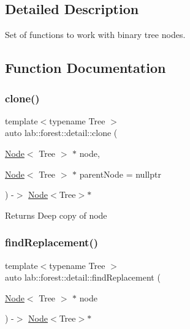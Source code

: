 \subsection{Detailed Description}
Set of functions to work with binary tree nodes. 

\subsection{Function Documentation}
\mbox{\label{namespacelab_1_1forest_1_1detail_a1268b660bcac79b1fb63758a157cba64}} 
\subsubsection{\texorpdfstring{clone()}{clone()}}
{\footnotesize\ttfamily template$<$typename Tree $>$ \\
auto lab\+::forest\+::detail\+::clone (\begin{DoxyParamCaption}\item[{\hyperlink{structlab_1_1forest_1_1detail_1_1Node}{Node}$<$ Tree $>$ $\ast$}]{node,  }\item[{\hyperlink{structlab_1_1forest_1_1detail_1_1Node}{Node}$<$ Tree $>$ $\ast$}]{parent\+Node = {\ttfamily nullptr} }\end{DoxyParamCaption}) -\/$>$ \hyperlink{structlab_1_1forest_1_1detail_1_1Node}{Node}$<$Tree$>$$\ast$ }

\begin{DoxyReturn}{Returns}
Deep copy of node 
\end{DoxyReturn}
\mbox{\label{namespacelab_1_1forest_1_1detail_a708d9e4ef9e2c273fe36235b092dbd25}} 
\subsubsection{\texorpdfstring{find\+Replacement()}{findReplacement()}}
{\footnotesize\ttfamily template$<$typename Tree $>$ \\
auto lab\+::forest\+::detail\+::find\+Replacement (\begin{DoxyParamCaption}\item[{\hyperlink{structlab_1_1forest_1_1detail_1_1Node}{Node}$<$ Tree $>$ $\ast$}]{node }\end{DoxyParamCaption}) -\/$>$ \hyperlink{structlab_1_1forest_1_1detail_1_1Node}{Node}$<$Tree$>$$\ast$ }



